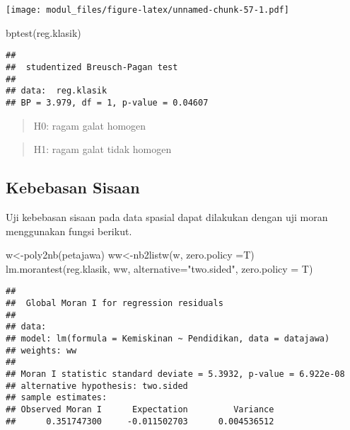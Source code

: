 \documentclass[
]{book}
\newenvironment{Shaded}{\begin{snugshade}}{\end{snugshade}}
\newcommand{\AttributeTok}[1]{\textcolor[rgb]{0.77,0.63,0.00}{#1}}
\newcommand{\FunctionTok}[1]{\textcolor[rgb]{0.00,0.00,0.00}{#1}}
\newcommand{\NormalTok}[1]{#1}
\newcommand{\OtherTok}[1]{\textcolor[rgb]{0.56,0.35,0.01}{#1}}
\newcommand{\StringTok}[1]{\textcolor[rgb]{0.31,0.60,0.02}{#1}}
\begin{document}
\texttt{[image: modul\_files/figure-latex/unnamed-chunk-57-1.pdf]}

\begin{Shaded}
\begin{Highlighting}[]
\FunctionTok{bptest}\NormalTok{(reg.klasik)}
\end{Highlighting}
\end{Shaded}

\begin{verbatim}
## 
##  studentized Breusch-Pagan test
## 
## data:  reg.klasik
## BP = 3.979, df = 1, p-value = 0.04607
\end{verbatim}

\begin{quote}
H0: ragam galat homogen
\end{quote}

\begin{quote}
H1: ragam galat tidak homogen
\end{quote}

\hypertarget{kebebasan-sisaan}{%
\subsection{Kebebasan Sisaan}\label{kebebasan-sisaan}}

Uji kebebasan sisaan pada data spasial dapat dilakukan dengan uji moran menggunakan fungsi berikut.

\begin{Shaded}
\begin{Highlighting}[]
\NormalTok{w}\OtherTok{\textless{}{-}}\FunctionTok{poly2nb}\NormalTok{(petajawa)}
\NormalTok{ww}\OtherTok{\textless{}{-}}\FunctionTok{nb2listw}\NormalTok{(w, }\AttributeTok{zero.policy =}\NormalTok{T)}
\FunctionTok{lm.morantest}\NormalTok{(reg.klasik, ww, }\AttributeTok{alternative=}\StringTok{"two.sided"}\NormalTok{, }\AttributeTok{zero.policy =}\NormalTok{ T)}
\end{Highlighting}
\end{Shaded}

\begin{verbatim}
## 
##  Global Moran I for regression residuals
## 
## data:  
## model: lm(formula = Kemiskinan ~ Pendidikan, data = datajawa)
## weights: ww
## 
## Moran I statistic standard deviate = 5.3932, p-value = 6.922e-08
## alternative hypothesis: two.sided
## sample estimates:
## Observed Moran I      Expectation         Variance 
##      0.351747300     -0.011502703      0.004536512
\end{verbatim}
\end{document}
